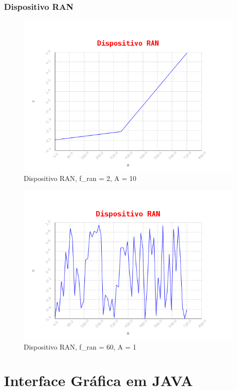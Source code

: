 \documentclass{beamer}
\begin{document}
\begin{frame}
 \frametitle{Dispositivo RAN}
 \begin{figure}
  \includegraphics[scale=0.4]{./images/RAN_F_2.png}
  \caption{Dispositivo RAN, f\_ran = 2, A = 10}
   \end{figure}
\end{frame}
   \begin{frame}
 \begin{figure}
  \includegraphics[scale=0.4]{./images/RAN_F_60.png}
  \caption{Dispositivo RAN, f\_ran = 60, A = 1}
 \end{figure} 

\end{frame}


\section{Interface Gráfica em JAVA}
\end{document}
